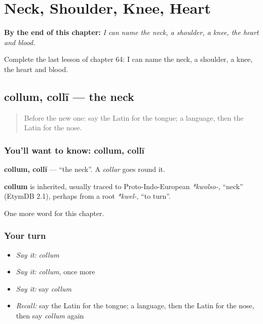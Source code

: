 
\chapter{Neck, Shoulder, Knee, Heart}
\label{ch:la-neck-shoulder-knee-heart}

\begin{chapteropening}
\textbf{By the end of this chapter:} \emph{I can name the neck, a shoulder, a knee, the heart and blood.}

Complete the last lesson of chapter 64: I can name the neck, a shoulder, a knee, the heart and blood.
\end{chapteropening}

\section[collum, collī]{collum, collī — the neck}

\label{lesson:LA-C64-collum}



\begin{quote}
Before the new one: say the Latin for the tongue; a language, then the Latin for the nose.
\end{quote}

\subsection*{You'll want to know: collum, collī}
\textbf{collum, collī} — \textquotedblleft{}the neck\textquotedblright{}. A \emph{collar} goes round it.

\begin{cousinweb}
\textbf{collum} is inherited, usually traced to Proto-Indo-European \emph{*kwolso-}, \textquotedblleft{}neck\textquotedblright{} (EtymDB 2.1), perhaps from a root \emph{*kwel-}, \textquotedblleft{}to turn\textquotedblright{}.
\end{cousinweb}

\begin{grammarlens}[title={What you've built}]
One more word for this chapter.
\end{grammarlens}

\subsection*{Your turn}
\begin{itemize}
\raggedright
  \item \emph{Say it:} \emph{collum}
  \item \emph{Say it:} \emph{collum}, once more
  \item \emph{Say it:} say \emph{collum}
  \item \emph{Recall:} say the Latin for the tongue; a language, then the Latin for the nose, then say \emph{collum} again
\end{itemize}

